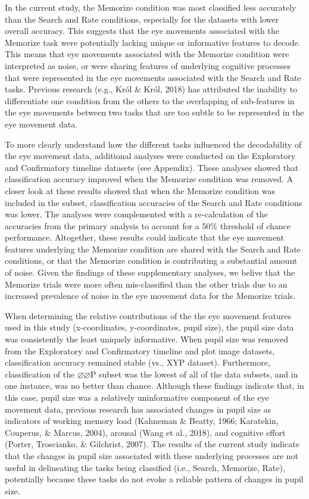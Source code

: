\documentclass[
  english,
  man,floatsintext]{apa6}
\begin{document}
In the current study, the Memorize condition was most classified less accurately than the Search and Rate conditions, especially for the datasets with lower overall accuracy. This suggests that the eye movements associated with the Memorize task were potentially lacking unique or informative features to decode. This means that eye movements associated with the Memorize condition were interpreted as noise, or were sharing features of underlying cognitive processes that were represented in the eye movements associated with the Search and Rate tasks. Previous research (e.g., Król \& Król, 2018) has attributed the inability to differentiate one condition from the others to the overlapping of sub-features in the eye movements between two tasks that are too subtle to be represented in the eye movement data.

To more clearly understand how the different tasks influenced the decodability of the eye movement data, additional analyses were conducted on the Exploratory and Confirmatory timeline datasets (see Appendix). These analyses showed that classification accuracy improved when the Memorize condition was removed. A closer look at these results showed that when the Memorize condition was included in the subset, classification accuracies of the Search and Rate conditions was lower. The analyses were complemented with a re-calculation of the accuracies from the primary analysis to account for a 50\% threshold of chance performance. Altogether, these results could indicate that the eye movement features underlying the Memorize condition are shared with the Search and Rate conditions, or that the Memorize condition is contributing a substantial amount of noise. Given the findings of these supplementary analyses, we belive that the Memorize trials were more often mis-classified than the other trials due to an increased prevalence of noise in the eye movement data for the Memorize trials.

When determining the relative contributions of the the eye movement features used in this study (x-coordinates, y-coordinates, pupil size), the pupil size data was consistently the least uniquely informative. When pupil size was removed from the Exploratory and Confirmatory timeline and plot image datasets, classification accuracy remained stable (vs., XYP dataset). Furthermore, classification of the \(\varnothing\varnothing\)P subset was the lowest of all of the data subsets, and in one instance, was no better than chance. Although these findings indicate that, in this case, pupil size was a relatively uninformative component of the eye movement data, previous research has associated changes in pupil size as indicators of working memory load (Kahneman \& Beatty, 1966; Karatekin, Couperus, \& Marcus, 2004), arousal (Wang et al., 2018), and cognitive effort (Porter, Troscianko, \& Gilchrist, 2007). The results of the current study indicate that the changes in pupil size associated with these underlying processes are not useful in delineating the tasks being classified (i.e., Search, Memorize, Rate), potentially because these tasks do not evoke a reliable pattern of changes in pupil size.
\end{document}
